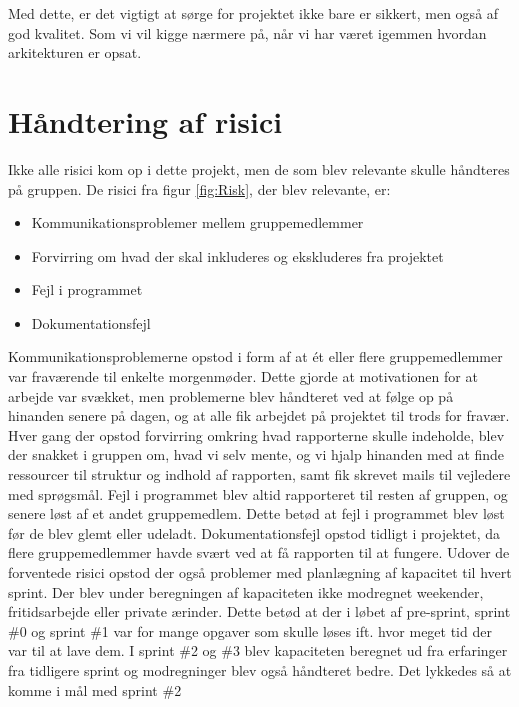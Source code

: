 Med dette, er det vigtigt at sørge for projektet ikke bare er sikkert, men også af god kvalitet. Som vi vil kigge nærmere på, når vi har været igemmen hvordan arkitekturen er opsat. 


\section{Håndtering af risici}\label{sec:handling_risks}
Ikke alle risici kom op i dette projekt, men de som blev relevante skulle håndteres på gruppen. De risici fra figur \ref{fig:Risk}, der blev relevante, er:
\begin{itemize}
    \item Kommunikationsproblemer mellem gruppemedlemmer
    \item Forvirring om hvad der skal inkluderes og ekskluderes fra projektet
    \item Fejl i programmet
    \item Dokumentationsfejl
\end{itemize}

Kommunikationsproblemerne opstod i form af at ét eller flere gruppemedlemmer var fraværende til enkelte morgenmøder. Dette gjorde at motivationen for at arbejde var svækket, men problemerne blev håndteret ved at følge op på hinanden senere på dagen, og at alle fik arbejdet på projektet til trods for fravær. 
Hver gang der opstod forvirring omkring hvad rapporterne skulle indeholde, blev der snakket i gruppen om, hvad vi selv mente, og vi hjalp hinanden med at finde ressourcer til struktur og indhold af rapporten, samt fik skrevet mails til vejledere med sprøgsmål.
Fejl i programmet blev altid rapporteret til resten af gruppen, og senere løst af et andet gruppemedlem. Dette betød at fejl i programmet blev løst før de blev glemt eller udeladt. 
Dokumentationsfejl opstod tidligt i projektet, da flere gruppemedlemmer havde svært ved at få rapporten til at fungere. 
Udover de forventede risici opstod der også problemer med planlægning af kapacitet til hvert sprint. Der blev under beregningen af kapaciteten ikke modregnet weekender, fritidsarbejde eller private ærinder. Dette betød at der i løbet af pre-sprint, sprint \#0 og sprint \#1 var for mange opgaver som skulle løses ift. hvor meget tid der var til at lave dem. I sprint \#2 og \#3 blev kapaciteten beregnet ud fra erfaringer fra tidligere sprint og modregninger blev også håndteret bedre. Det lykkedes så at komme i mål med sprint \#2 %
